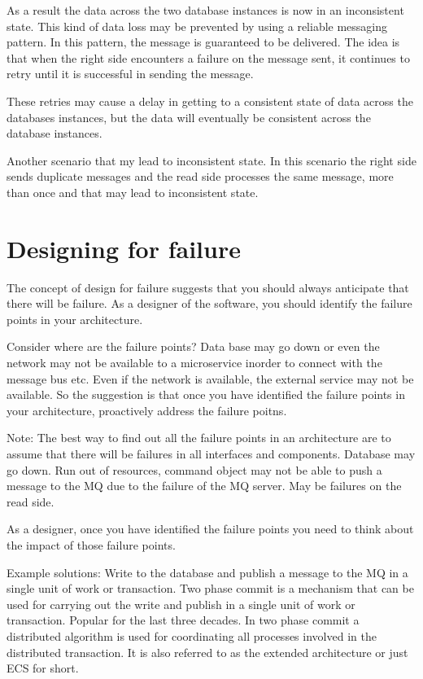 As a result the data across the two database instances is now in an inconsistent state.
This kind of data loss may be prevented by using a reliable messaging pattern.
In this pattern, the message is guaranteed to be delivered.
The idea is that when the right side encounters a failure on the message sent, it continues to retry until it is successful in sending the message.

These retries may cause a delay in getting to a consistent state of data across the databases instances, but the data will eventually be consistent across the database instances.

Another scenario that my lead to inconsistent state.
In this scenario the right side sends duplicate messages and the read side processes the same message, more than once and that may lead to inconsistent state.


\section{Designing for failure}
The concept of design for failure suggests that you should always anticipate that there will be failure.
As a designer of the software, you should identify the failure points in your architecture.

Consider where are the failure points?
Data base may go down or even the network may not be available to a microservice inorder to connect with the message bus etc.
Even if the network is available, the external service may not be available.
So the suggestion is that once you have identified the failure points in your architecture, proactively address the failure poitns.

Note:
The best way to find out all the failure points in an architecture are to assume that there will be failures in all interfaces and components.
Database may go down. Run out of resources, command object may not be able to push a message to the MQ due to the failure of the MQ server.
May be failures on the read side.

As a designer, once you have identified the failure points you need to think about the impact of those failure points.

Example solutions:
Write to the database and publish a message to the MQ in a single unit of work or transaction.
Two phase commit is a mechanism that can be used for carrying out the write and publish in a single unit of work or transaction.
Popular for the last three decades.
In two phase commit a distributed algorithm is used for coordinating all processes involved in the distributed transaction.
It is also referred to as the extended architecture or just ECS for short.

